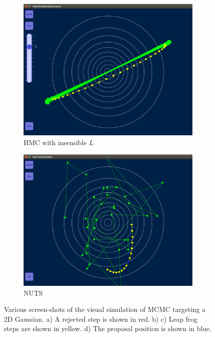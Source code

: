 \documentclass[10pt]{proc}
\begin{document}
\begin{figure}[htp]
\begin{subfigure}[t]{0.49\textwidth}
  \includegraphics[width=\textwidth]{processing_hmc2.png}
  \caption{HMC with insensible $L$}
\end{subfigure}
\begin{subfigure}[t]{0.49\textwidth}
  \includegraphics[width=\textwidth]{processing_nuts.png}
  \caption{NUTS}
\end{subfigure}
\caption{Various screen-shots of the visual simulation of MCMC targeting a 2D Gaussian. a) A rejected step is shown in red. b) c) Leap frog steps are shown in yellow. d) The proposal position is shown in blue.}
\label{fig:processing}
\end{figure}
\end{document}
